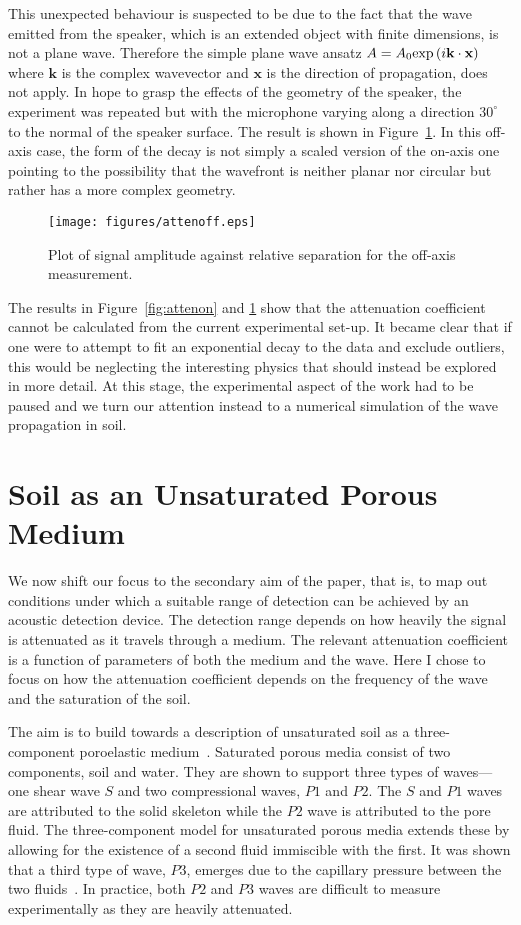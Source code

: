 \documentclass[twocolumn]{article}
\begin{document}
This unexpected behaviour is suspected to be due to the fact that the wave emitted from the speaker, which is an extended object with finite dimensions, is not a plane wave. Therefore the simple plane wave ansatz $A = A_0\textrm{exp\,}(i\textbf{k}\cdot\textbf{x})$ where $\textbf{k}$ is the complex wavevector and $\textbf{x}$ is the direction of propagation, does not apply. In hope to grasp the effects of the geometry of the speaker, the experiment was repeated but with the microphone varying along a direction $\num{30}^\circ$ to the normal of the speaker surface. The result is shown in Figure~\ref{fig:attenoff}. In this off-axis case, the form of the decay is not simply a scaled version of the on-axis one pointing to the possibility that the wavefront is neither planar nor circular but rather has a more complex geometry.
\begin{figure}
    \centering
    \texttt{[image: figures/attenoff.eps]}
    \caption{Plot of signal amplitude against relative separation for the off-axis measurement.}
    \label{fig:attenoff}
\end{figure}
The results in Figure~\ref{fig:attenon} and \ref{fig:attenoff} show that the attenuation coefficient cannot be calculated from the current experimental set-up. It became clear that if one were to attempt to fit an exponential decay to the data and exclude outliers, this would be neglecting the interesting physics that should instead be explored in more detail. At this stage, the experimental aspect of the work had to be paused and we turn our attention instead to a numerical simulation of the wave propagation in soil.

\section{Soil as an Unsaturated Porous Medium}
We now shift our focus to the secondary aim of the paper, that is, to map out conditions under which a suitable range of  detection can be achieved by an acoustic detection device. The detection range depends on how heavily the signal is attenuated as it travels through a medium. The relevant attenuation coefficient is a function of parameters of both the medium and the wave. Here I chose to focus on how the attenuation coefficient depends on the frequency of the wave and the saturation of the soil.

The aim is to build towards a description of unsaturated soil as a three-component poroelastic medium~\cite{detmann_propagation_2008}. Saturated porous media consist of two components, soil and water. They are shown to support three types of waves---one shear wave $S$ and two compressional waves, $P1$ and $P2$. The $S$ and $P1$ waves are attributed to the solid skeleton while the $P2$ wave is attributed to the pore fluid. The three-component model for unsaturated porous media extends these by allowing for the existence of a second fluid immiscible with the first. It was shown that a third type of wave, $P3$, emerges due to the capillary pressure between the two fluids~\cite{detmann_num_sim_2008}. In practice, both $P2$ and $P3$ waves are difficult to measure experimentally as they are heavily attenuated.
\end{document}
